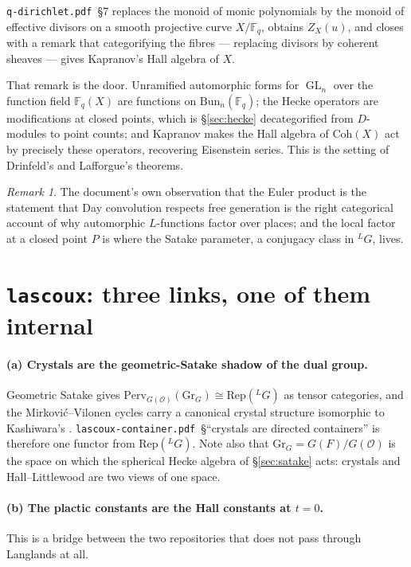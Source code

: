 \documentclass[11pt,a4paper]{article}
\theoremstyle{definition}
\theoremstyle{remark}
\newtheorem{remark}[theorem]{Remark}
\newcommand{\FF}{\mathbb{F}}
\newcommand{\OO}{\mathcal{O}}
\newcommand{\Coh}{\mathrm{Coh}}
\newcommand{\Bun}{\mathrm{Bun}}
\newcommand{\Rep}{\mathrm{Rep}}
\newcommand{\Perv}{\mathrm{Perv}}
\newcommand{\Gr}{\mathrm{Gr}}
\newcommand{\dual}[1]{{}^{L}\!#1}
\DeclareMathOperator{\GL}{GL}
\begin{document}
\texttt{q-dirichlet.pdf}~\S7 replaces the monoid of monic polynomials by the
monoid of effective divisors on a smooth projective curve $X/\FF_q$, obtains
$Z_X(u)$, and closes with a remark that categorifying the fibres --- replacing
divisors by coherent sheaves --- gives Kapranov's Hall algebra of $X$.

That remark is the door. Unramified automorphic forms for $\GL_n$ over the
function field $\FF_q(X)$ are functions on $\Bun_n(\FF_q)$; the Hecke operators
are modifications at closed points, which is \S\ref{sec:hecke} decategorified
from $D$-modules to point counts; and Kapranov \cite{Kapranov} makes the Hall
algebra of $\Coh(X)$ act by precisely these operators, recovering Eisenstein
series. This is the setting of Drinfeld's and Lafforgue's theorems.

\begin{remark}
The document's own observation that the Euler product is the statement that Day
convolution respects free generation is the right categorical account of why
automorphic $L$-functions factor over places; and the local factor at a closed
point $P$ is where the Satake parameter, a conjugacy class in $\dual{G}$, lives.
\end{remark}

\section{\texttt{lascoux}: three links, one of them internal}\label{sec:lascoux}

\paragraph{(a) Crystals are the geometric-Satake shadow of the dual group.}
Geometric Satake \cite{MV} gives
$\Perv_{G(\OO)}(\Gr_G) \cong \Rep(\dual{G})$ as tensor categories, and the
Mirkovi\'c--Vilonen cycles carry a canonical crystal structure isomorphic to
Kashiwara's \cite{BG,Kamnitzer}. \texttt{lascoux-container.pdf}~\S``crystals are
directed containers'' is therefore one functor from $\Rep(\dual{G})$. Note also
that $\Gr_G = G(F)/G(\OO)$ is the space on which the spherical Hecke algebra of
\S\ref{sec:satake} acts: crystals and Hall--Littlewood are two views of one
space.

\paragraph{(b) The plactic constants are the Hall constants at $t = 0$.}
This is a bridge between the two repositories that does not pass through
Langlands at all.
\end{document}

